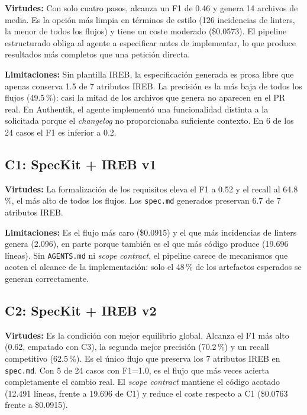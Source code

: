 \textbf{Virtudes:} Con solo cuatro pasos, alcanza un F1 de 0.46 y genera 14 archivos de media. Es la opci\'on m\'as limpia en t\'erminos de estilo (126 incidencias de linters, la menor de todos los flujos) y tiene un coste moderado (\$0.0573). El pipeline estructurado obliga al agente a especificar antes de implementar, lo que produce resultados m\'as completos que una petici\'on directa.

\textbf{Limitaciones:} Sin plantilla IREB, la especificaci\'on generada es prosa libre que apenas conserva 1.5 de 7 atributos IREB. La precisi\'on es la m\'as baja de todos los flujos (49.5\,\%): casi la mitad de los archivos que genera no aparecen en el PR real. En Authentik, el agente implement\'o una funcionalidad distinta a la solicitada porque el \emph{changelog} no proporcionaba suficiente contexto. En 6 de los 24 casos el F1 es inferior a 0.2.

\subsection{C1: SpecKit + IREB v1}

\textbf{Virtudes:} La formalizaci\'on de los requisitos eleva el F1 a 0.52 y el recall al 64.8\,\%, el m\'as alto de todos los flujos. Los \texttt{spec.md} generados preservan 6.7 de 7 atributos IREB.

\textbf{Limitaciones:} Es el flujo m\'as caro (\$0.0915) y el que m\'as incidencias de linters genera (2.096), en parte porque tambi\'en es el que m\'as c\'odigo produce (19.696 l\'ineas). Sin \texttt{AGENTS.md} ni \emph{scope contract}, el pipeline carece de mecanismos que acoten el alcance de la implementaci\'on: solo el 48\,\% de los artefactos esperados se generan correctamente.

\subsection{C2: SpecKit + IREB v2}

\textbf{Virtudes:} Es la condici\'on con mejor equilibrio global. Alcanza el F1 m\'as alto (0.62, empatado con C3), la segunda mejor precisi\'on (70.2\,\%) y un recall competitivo (62.5\,\%). Es el \'unico flujo que preserva los 7 atributos IREB en \texttt{spec.md}. Con 5 de 24 casos con F1=1.0, es el flujo que m\'as veces acierta completamente el cambio real. El \emph{scope contract} mantiene el c\'odigo acotado (12.491 l\'ineas, frente a 19.696 de C1) y reduce el coste respecto a C1 (\$0.0763 frente a \$0.0915).

